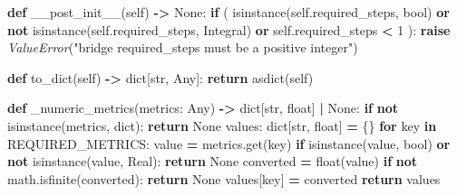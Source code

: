 \documentclass[
  american,
  11pt,
  letterpaper,
]{article}
\newenvironment{Shaded}{\begin{snugshade}}{\end{snugshade}}
\newcommand{\BuiltInTok}[1]{#1}
\newcommand{\ControlFlowTok}[1]{\textcolor[rgb]{0.13,0.29,0.53}{\textbf{#1}}}
\newcommand{\DecValTok}[1]{\textcolor[rgb]{0.00,0.00,0.81}{#1}}
\newcommand{\KeywordTok}[1]{\textcolor[rgb]{0.13,0.29,0.53}{\textbf{#1}}}
\newcommand{\NormalTok}[1]{#1}
\newcommand{\OperatorTok}[1]{\textcolor[rgb]{0.81,0.36,0.00}{\textbf{#1}}}
\newcommand{\PreprocessorTok}[1]{\textcolor[rgb]{0.56,0.35,0.01}{\textit{#1}}}
\newcommand{\StringTok}[1]{\textcolor[rgb]{0.31,0.60,0.02}{#1}}
\newcommand{\VariableTok}[1]{\textcolor[rgb]{0.00,0.00,0.00}{#1}}
\renewenvironment{Shaded}{\par\smallskip}{\par\smallskip}
\begin{document}
\begin{Shaded}
\begin{Highlighting}[]
    \KeywordTok{def}\NormalTok{ \_\_post\_init\_\_(}\VariableTok{self}\NormalTok{) }\OperatorTok{{-}\textgreater{}} \VariableTok{None}\NormalTok{:}
        \ControlFlowTok{if}\NormalTok{ (}
            \BuiltInTok{isinstance}\NormalTok{(}\VariableTok{self}\NormalTok{.required\_steps, }\BuiltInTok{bool}\NormalTok{)}
            \KeywordTok{or} \KeywordTok{not} \BuiltInTok{isinstance}\NormalTok{(}\VariableTok{self}\NormalTok{.required\_steps, Integral)}
            \KeywordTok{or} \VariableTok{self}\NormalTok{.required\_steps }\OperatorTok{\textless{}} \DecValTok{1}
\NormalTok{        ):}
            \ControlFlowTok{raise} \PreprocessorTok{ValueError}\NormalTok{(}\StringTok{"bridge required\_steps must be a positive integer"}\NormalTok{)}

    \KeywordTok{def}\NormalTok{ to\_dict(}\VariableTok{self}\NormalTok{) }\OperatorTok{{-}\textgreater{}} \BuiltInTok{dict}\NormalTok{[}\BuiltInTok{str}\NormalTok{, Any]:}
        \ControlFlowTok{return}\NormalTok{ asdict(}\VariableTok{self}\NormalTok{)}


\KeywordTok{def}\NormalTok{ \_numeric\_metrics(metrics: Any) }\OperatorTok{{-}\textgreater{}} \BuiltInTok{dict}\NormalTok{[}\BuiltInTok{str}\NormalTok{, }\BuiltInTok{float}\NormalTok{] }\OperatorTok{|} \VariableTok{None}\NormalTok{:}
    \ControlFlowTok{if} \KeywordTok{not} \BuiltInTok{isinstance}\NormalTok{(metrics, }\BuiltInTok{dict}\NormalTok{):}
        \ControlFlowTok{return} \VariableTok{None}
\NormalTok{    values: }\BuiltInTok{dict}\NormalTok{[}\BuiltInTok{str}\NormalTok{, }\BuiltInTok{float}\NormalTok{] }\OperatorTok{=}\NormalTok{ \{\}}
    \ControlFlowTok{for}\NormalTok{ key }\KeywordTok{in}\NormalTok{ REQUIRED\_METRICS:}
\NormalTok{        value }\OperatorTok{=}\NormalTok{ metrics.get(key)}
        \ControlFlowTok{if} \BuiltInTok{isinstance}\NormalTok{(value, }\BuiltInTok{bool}\NormalTok{) }\KeywordTok{or} \KeywordTok{not} \BuiltInTok{isinstance}\NormalTok{(value, Real):}
            \ControlFlowTok{return} \VariableTok{None}
\NormalTok{        converted }\OperatorTok{=} \BuiltInTok{float}\NormalTok{(value)}
        \ControlFlowTok{if} \KeywordTok{not}\NormalTok{ math.isfinite(converted):}
            \ControlFlowTok{return} \VariableTok{None}
\NormalTok{        values[key] }\OperatorTok{=}\NormalTok{ converted}
    \ControlFlowTok{return}\NormalTok{ values}



\end{Highlighting}
\end{Shaded}
\end{document}
